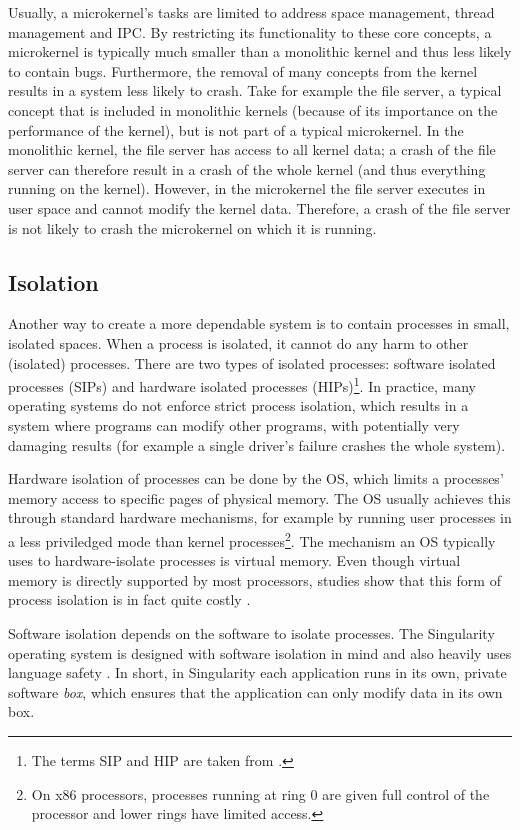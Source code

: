 Usually, a microkernel's tasks are limited to address space management, thread management and IPC. By restricting its functionality to these core concepts, a microkernel is typically much smaller than a monolithic kernel and thus less likely to contain bugs. Furthermore, the removal of many concepts from the kernel results in a system less likely to crash. Take for example the file server, a typical concept that is included in monolithic kernels (because of its importance on the performance of the kernel), but is not part of a typical microkernel. In the monolithic kernel, the file server has access to all kernel data; a crash of the file server can therefore result in a crash of the whole kernel (and thus everything running on the kernel). However, in the microkernel the file server executes in user space and cannot modify the kernel data. Therefore, a crash of the file server is not likely to crash the microkernel on which it is running.

\subsection{Isolation}
Another way to create a more dependable system is to contain processes in small, isolated spaces. When a process is isolated, it cannot do any harm to other (isolated) processes. There are two types of isolated processes: software isolated processes (SIPs) and hardware isolated processes (HIPs)\footnote{The terms SIP and HIP are taken from \cite{aiken06deconstructing}.}. In practice, many operating systems do not enforce strict process isolation, which results in a system where programs can modify other programs, with potentially very damaging results (for example a single driver's failure crashes the whole system).\emptyline

Hardware isolation of processes can be done by the OS, which limits a processes' memory access to specific pages of physical memory. The OS usually achieves this through standard hardware mechanisms, for example by running user processes in a less priviledged mode than kernel processes\footnote{On x86 processors, processes running at ring 0 are given full control of the processor and lower rings have limited access.}. The mechanism an OS typically uses to hardware-isolate processes is virtual memory. Even though virtual memory is directly supported by most processors, studies show that this form of process isolation is in fact quite costly \cite{aiken06deconstructing,mehnert02cost}.\emptyline

Software isolation depends on the software to isolate processes. The Singularity operating system \cite{hunt05singularity} is designed with software isolation in mind and also heavily uses language safety \cite{aiken06deconstructing,fahndrich06languagesupport,hunt05sealing}. In short, in Singularity each application runs in its own, private software \emph{box}, which ensures that the application can only modify data in its own box.\emptyline

